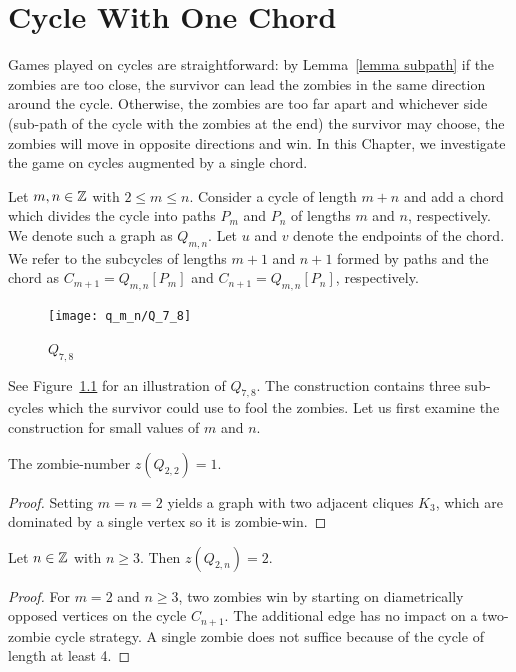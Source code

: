 \chapter{Cycle With One Chord}\label{chapter q_m_n}

Games played on cycles are straightforward: by Lemma~\ref{lemma subpath} if the zombies are too close, the survivor can lead the zombies in the same direction around the cycle. Otherwise, the zombies are too far apart and whichever side (sub-path of the cycle with the zombies at the end) the survivor may choose, the zombies will move in opposite directions and win. In this Chapter, we investigate the game on cycles augmented by a single chord.

\begin{definition}
 Let $m, n \in \mathbb{Z}$ with $2\leq m \leq n$. Consider a cycle of length $m+n$ and add a chord which
 divides the cycle into paths $P_m$ and $P_n$ of lengths $m$ and $n$, respectively.
 We denote such a graph as $Q_{m,n}$. Let $u$ and $v$ denote the endpoints of the chord. We refer to the subcycles of lengths $m+1$ and $n+1$ formed by paths and the chord as $C_{m+1} = Q_{m,n}[P_m]$ and $C_{n+1} = Q_{m,n}[P_n]$, respectively.
\end{definition}

\begin{figure}
  \centering
 \texttt{[image: q\_m\_n/Q\_7\_8]}
 \caption{$Q_{7,8}$ \label{fig:Q_7_8}}
\end{figure}

See Figure~\ref{fig:Q_7_8} for an illustration of $Q_{7,8}$.
The construction contains three sub-cycles which the survivor could use to fool the zombies.
Let us first examine the construction for small values of $m$ and $n$.

 \begin{lemma}
The zombie-number $z(Q_{2,2}) = 1$.
 \end{lemma}
\begin{proof}
  Setting $m=n=2$ yields a graph with two adjacent cliques $K_3$, which are dominated by a single vertex so it is zombie-win.
\end{proof}

\begin{lemma}
  Let $n \in \mathbb{Z}$ with $n \geq 3$. Then $z(Q_{2,n}) = 2$.
\end{lemma}
\begin{proof}
  For $m=2$ and $n\geq 3$, two zombies win by starting on diametrically
  opposed vertices on the cycle $C_{n+1}$. The additional edge has no impact on a two-zombie cycle strategy. A single zombie does not suffice because of the cycle of length at least 4.
\end{proof}

